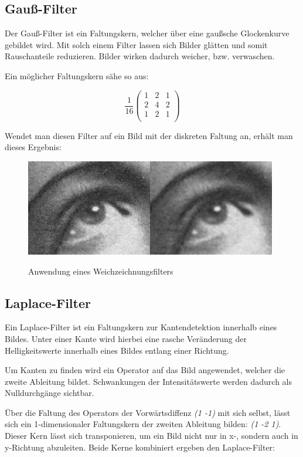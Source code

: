 \subsection{Gauß-Filter}
Der Gauß-Filter ist ein Faltungskern, welcher über eine gaußsche Glockenkurve gebildet wird.
Mit solch einem Filter lassen sich Bilder glätten und somit Rauschanteile reduzieren.
Bilder wirken dadurch weicher, bzw. verwaschen.

Ein möglicher Faltungskern sähe so aus:

$$ \frac{1}{16} \left( \begin{array}{rrr}
1 & 2 & 1 \\
2 & 4 & 2 \\
1 & 2 & 1 \\
\end{array}\right) $$

Wendet man diesen Filter auf ein Bild mit der diskreten Faltung an, erhält man dieses Ergebnis:

\begin{figure}[ht]
   \centering
     \includegraphics[width=11cm]{Bilder/Gaussian_Blur} \\
 \caption{Anwendung eines Weichzeichnungsfilters}
 \label{fig:Blur}
\end{figure}

\subsection{Laplace-Filter}
Ein Laplace-Filter ist ein Faltungskern zur Kantendetektion innerhalb eines Bildes.
Unter einer Kante wird hierbei eine rasche Veränderung der Helligkeitswerte innerhalb eines Bildes entlang einer Richtung.

Um Kanten zu finden wird ein Operator auf das Bild angewendet, welcher die zweite Ableitung bildet. Schwankungen der Intensitätswerte werden dadurch als Nulldurchgänge sichtbar.

Über die Faltung des Operators der Vorwärtsdiffenz {\em (1 -1)} mit sich selbst, lässt sich ein 1-dimensionaler Faltungskern der zweiten Ableitung bilden: {\em (1 -2 1)}.
Dieser Kern lässt sich transponieren, um ein Bild nicht nur in x-, sondern auch in y-Richtung abzuleiten.
Beide Kerne kombiniert ergeben den Laplace-Filter:

